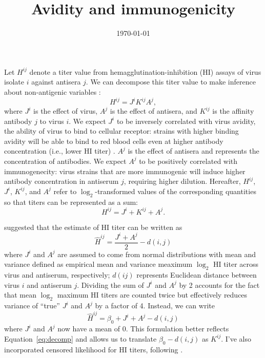 \documentclass[12pt]{article}
\title{Avidity and immunogenicity}
\date{\today}
\begin{document}
\maketitle

Let $H^{ij}$ denote a titer value from hemagglutination-inhibition (HI) assays of virus isolate $i$ against antisera $j$.
We can decompose this titer value to make inference about non-antigenic variables \citep{li2013single}:
\begin{equation}\label{eq:decomp}
H^{ij} = J^i K^{ij} A^j,
\end{equation}
where $J^i$ is the effect of virus, $A^j$ is the effect of antisera, and $K^{ij}$ is the affinity antibody $j$ to virus $i$.
We expect $J^i$ to be inversely correlated with virus avidity, the ability of virus to bind to cellular receptor: strains with higher binding avidity will be able to bind to red blood cells even at higher antibody concentration (i.e., lower HI titer) \citep{ndifon2011new}.
$A^j$ is the effect of antisera and represents the concentration of antibodies.
We expect $A^j$ to be positively correlated with immunogenecity: virus strains that are more immunogenic will induce higher antibody concentration in antiserum $j$, requiring higher dilution.
Hereafter, $H^{ij}$, $J^i$, $K^{ij}$, and $A^j$ refer to $\log_2$-transformed values of the corresponding quantities so that titers can be represented as a sum:
\begin{equation}
H^{ij} = J^i + K^{ij} + A^j. 
\end{equation}

\cite{bedford2014integrating} suggested that the estimate of HI titer can be written as 
\begin{equation}
\hat{H}^{ij} = \frac{J^i + A^j}{2} - d(i, j)
\end{equation}
where $J^i$ and $A^j$ are assumed to come from normal distributions with mean and variance defined as empirical mean and variance meaximum $\log_2$ HI titer across virus and antiserum, respectively; $d(ij)$ represents Euclidean distance between virus $i$ and antiserum $j$.
Dividing the sum of $J^i$ and $A^j$ by 2 accounts for the fact that mean $\log_2$ maximum HI titers are counted twice but effectively reduces variance of ``true'' $J^i$ and $A^j$ by a factor of 4.
Instead, we can write 
\begin{equation}
\hat{H}^{ij} = \beta_0 + J^i + A^j - d(i, j)
\end{equation}
where $J^i$ and $A^j$ now have a mean of 0. This formulation better reflects Equation~\ref{eq:decomp} and allows us to translate $\beta_0 - d(i, j)$ as $K^{ij}$.
I've also incorporated censored likelihood for HI titers, following \cite{bedford2014integrating}.
\end{document}
